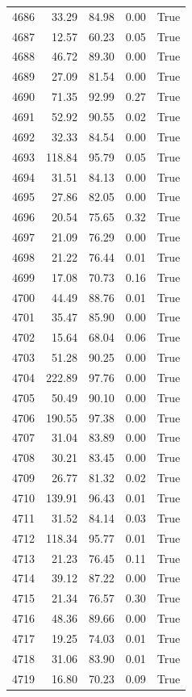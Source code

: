\begin{longtable}{rrrrr}
4686 & 33.29 & 84.98 & 0.00 & True \\
4687 & 12.57 & 60.23 & 0.05 & True \\
4688 & 46.72 & 89.30 & 0.00 & True \\
4689 & 27.09 & 81.54 & 0.00 & True \\
4690 & 71.35 & 92.99 & 0.27 & True \\
4691 & 52.92 & 90.55 & 0.02 & True \\
4692 & 32.33 & 84.54 & 0.00 & True \\
4693 & 118.84 & 95.79 & 0.05 & True \\
4694 & 31.51 & 84.13 & 0.00 & True \\
4695 & 27.86 & 82.05 & 0.00 & True \\
4696 & 20.54 & 75.65 & 0.32 & True \\
4697 & 21.09 & 76.29 & 0.00 & True \\
4698 & 21.22 & 76.44 & 0.01 & True \\
4699 & 17.08 & 70.73 & 0.16 & True \\
4700 & 44.49 & 88.76 & 0.01 & True \\
4701 & 35.47 & 85.90 & 0.00 & True \\
4702 & 15.64 & 68.04 & 0.06 & True \\
4703 & 51.28 & 90.25 & 0.00 & True \\
4704 & 222.89 & 97.76 & 0.00 & True \\
4705 & 50.49 & 90.10 & 0.00 & True \\
4706 & 190.55 & 97.38 & 0.00 & True \\
4707 & 31.04 & 83.89 & 0.00 & True \\
4708 & 30.21 & 83.45 & 0.00 & True \\
4709 & 26.77 & 81.32 & 0.02 & True \\
4710 & 139.91 & 96.43 & 0.01 & True \\
4711 & 31.52 & 84.14 & 0.03 & True \\
4712 & 118.34 & 95.77 & 0.01 & True \\
4713 & 21.23 & 76.45 & 0.11 & True \\
4714 & 39.12 & 87.22 & 0.00 & True \\
4715 & 21.34 & 76.57 & 0.30 & True \\
4716 & 48.36 & 89.66 & 0.00 & True \\
4717 & 19.25 & 74.03 & 0.01 & True \\
4718 & 31.06 & 83.90 & 0.01 & True \\
4719 & 16.80 & 70.23 & 0.09 & True \\

\end{longtable}
